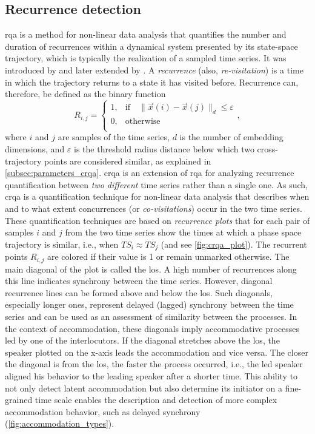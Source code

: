\subsection{Recurrence detection}
\label{subsec:recurrence_detection}

\Ac{rqa} is a method for non-linear data analysis that quantifies the number and duration of recurrences within a dynamical system presented by its state-space trajectory, which is typically the realization of a sampled time series.
It was introduced by \citet{Zbilut1992embeddings} and later extended by \citet{Webber2005recurrence, Marwan2002cross}.
A \emph{recurrence} (also, \emph{re-visitation}) is a time in which the trajectory returns to a state it has visited before.
Recurrence can, therefore, be defined as the binary function
%
\begin{equation}
	\label{eq:recurrence}
	R_{i,j} =
	\begin{cases}
		1,	&	\text{if} \quad \lVert \vec{x}(i)-\vec{x}(j) \rVert_d \leq \varepsilon \\
		0,	&	\text{otherwise} \\
	\end{cases},
\end{equation}
%
where $i$ and $j$ are samples of the time series, $d$ is the number of embedding dimensions, and $\varepsilon$ is the threshold radius distance below which two cross-trajectory points are considered similar, as explained in \cref{subsec:parameters_crqa}.
\Ac{crqa} is an extension of \ac{rqa} for analyzing recurrence quantification between \emph{two different} time series rather than a single one.
As such, \ac{crqa} is a quantification technique for non-linear data analysis that describes when and to what extent concurrences (or \emph{co-visitations}) occur in the two time series.
These quantification techniques are based on \emph{recurrence plots} that for each pair of samples $i$ and $j$ from the two time series show the times at which a phase space trajectory is similar, i.e., when $TS_i \approx TS_j$ (and see \cref{fig:crqa_plot}).
The recurrent points $R_{i,j}$ are colored if their value is 1 or remain unmarked otherwise.
The main diagonal of the plot is called the \acf{los}.
A high number of recurrences along this line indicates synchrony between the time series.
However, diagonal recurrence lines can be formed above and below the \ac{los}.
Such diagonals, especially longer ones, represent delayed (lagged) synchrony between the time series and can be used as an assessment of similarity between the processes.
In the context of accommodation, these diagonals imply accommodative processes led by one of the interlocutors.
If the diagonal stretches above the \ac{los}, the speaker plotted on the x-axis leads the accommodation and vice versa.
The closer the diagonal is from the \ac{los}, the faster the process occurred, i.e., the led speaker aligned his behavior to the leading speaker after a shorter time.
This ability to not only detect latent accommodation but also determine its initiator on a fine-grained time scale enables the description and detection of more complex accommodation behavior, such as delayed synchrony (\cref{fig:accommodation_types}).

